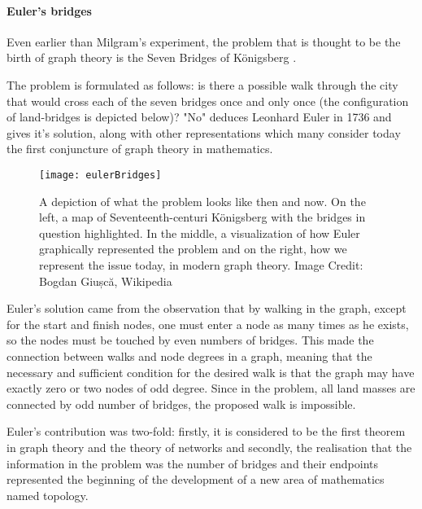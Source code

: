 \paragraph{Euler's bridges}
Even earlier than Milgram's experiment, the problem that is thought to be the birth of graph theory is the Seven Bridges of Königsberg \cite{eulerBridges}.\par
The problem is formulated as follows: is there a possible walk through the city that would cross each of the seven bridges once and only once (the configuration of land-bridges is depicted below)? "No" deduces Leonhard Euler in 1736 and gives it's solution, along with other representations which many consider today the first conjuncture of graph theory in mathematics.
\begin{figure}[!h]
  \centering
  \texttt{[image: eulerBridges]}
  \caption{A depiction of what the problem looks like then and now. On the left, a map of Seventeenth-centuri Königsberg with the bridges in question highlighted. In the middle, a visualization of how Euler graphically represented the problem and on the right, how we represent the issue today, in modern graph theory. Image Credit: Bogdan Giușcă, Wikipedia}
  \label{fig:eulerBridges}
\end{figure}

Euler's solution came from the observation that by walking in the graph, except for the start and finish nodes, one must enter a node as many times as he exists, so the nodes must be touched by even numbers of bridges. This made the connection between walks and node degrees in a graph, meaning that the necessary and sufficient condition for the desired walk is that the graph may have exactly zero or two nodes of odd degree. Since in the problem, all land masses are connected by odd number of bridges, the proposed walk is impossible.\par 
Euler's contribution was two-fold: firstly, it is considered to be the first theorem in graph theory and the theory of networks and secondly, the realisation that the information in the problem was the number of bridges and their endpoints represented the beginning of the development of a new area of mathematics named topology.



